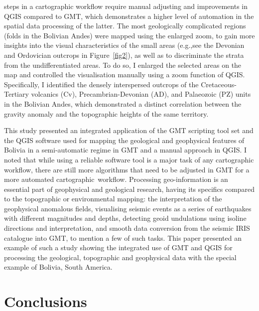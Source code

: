\documentclass[data,article,accept,pdftex,moreauthors]{Definitions/mdpi}
\begin{document}
 steps in {a} cartographic workflow require manual adjusting and improvements in {}QGIS compared to {}GMT, which demonstrates a higher level of automation in the {spatial} data processing {of the latter}. The most geologically complicated regions (folds in the Bolivian Andes) were mapped using {the} enlarged zoom, to gain more insights {into} the visual characteristics of the small areas ({e.g.,}see the Devonian and Ordovician outcrops in Figure~\ref{fig2}), {as well as} to discriminate the strata from the undifferentiated areas. To do so, I {enlarged the} selected areas on the map{ }and controlled {the} visualisation manually using a zoom function of QGIS. Specifically, I identified {the} densely interspersed outcrops of {the} Cretaceous-Tertiary volcanics (Cv), Precambrian-Devonian (AD), and {Palaeozoic} (PZ) units{ }in the Bolivian Andes, which demonstrated a {distinct} correlation {between the} gravity anomaly and {the} topographic heights {of} the same territory. 

This study presented an integrated application of the GMT scripting tool set and {the} QGIS software {used} for mapping the geological and geophysical {features} of Bolivia in a semi-automatic regime {in} GMT and {a} manual {approach in} QGIS. I noted that while using a reliable software tool is a major task of any cartographic {workflow}, there are still more algorithms that need to be {adjusted} in GMT for a more automated \mbox{cartographic workflow}. Processing geo-information{ is} an essential part of geophysical and geological research, having its specifics compared to the topographic or environmental mapping: {the} interpretation of {the} geophysical anomalous fields, visualising seismic events as {a series of} earthquakes {with different magnitudes and depths, detecting} geoid undulations {using} isoline directions and interpretation, and smooth data conversion from {the} seismic IRIS catalogue into GMT, {to mention a few of such tasks. This paper presented an example of such a study showing the integrated use of GMT and QGIS for processing the} geological, topographic and geophysical data{ with the special example of Bolivia, South America.} 

\section{Conclusions}
\end{document}
